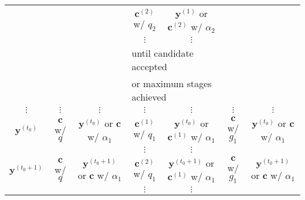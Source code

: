 \begin{sidewaystable}[h]
\begin{tabular}{|c||c|c||c|c||c|c|}
\cline{4-5}
                     &                         &                                         & $\mathbf{c}^{(2)}$ w/ $q_2$     & $\mathbf{y}^{(1)}$ or $\mathbf{c}^{(2)}$ w/ $\alpha_2$       &                  &                                         \\
\cline{4-5}
                     &                         &                                         & $\vdots$               & $\vdots$                                        &                  &                                         \\
\cline{4-5}
                     &                         &                                         & \multicolumn{2}{l||}{until candidate accepted}                           &                  &                                         \\
                     &                         &                                         & \multicolumn{2}{l||}{or maximum stages achieved}                         &                  &                                         \\
\hline
\hline
$\vdots$             & $\vdots$                & $\vdots$                                & $\vdots$               & $\vdots$                                        & $\vdots$         & $\vdots$                                \\
\hline
\hline
$\mathbf{y}^{(t_0)}$     & $\mathbf{c}$ w/ $q$              & $\mathbf{y}^{(t_0)}$ or $\mathbf{c}$ w/ $\alpha_1$     & $\mathbf{c}^{(1)}$ w/ $q_1$     & $\mathbf{y}^{(t_0)}$ or $\mathbf{c}^{(1)}$ w/ $\alpha_1$     & $\mathbf{c}$ w/ $g_1$     & $\mathbf{y}^{(t_0)}$ or $\mathbf{c}$ w/ $\alpha_1$     \\
\cline{4-5}
                     &                         &                                         & $\vdots$               & $\vdots$                                        &                  &                                         \\
\hline
\hline
$\mathbf{y}^{(t_0+1)}$   & $\mathbf{c}$ w/ $q$              & $\mathbf{y}^{(t_0+1)}$ or $\mathbf{c}$ w/ $\alpha_1$   & $\mathbf{c}^{(2)}$ w/ $q_1$     & $\mathbf{y}^{(t_0+1)}$ or $\mathbf{c}^{(1)}$ w/ $\alpha_1$   & $\mathbf{c}$ w/ $g_1$     & $\mathbf{y}^{(t_0+1)}$ or $\mathbf{c}$ w/ $\alpha_1$   \\
\cline{4-5}
                     &                         &                                         & $\vdots$               & $\vdots$                                        &                  &                                         \\

\end{tabular}
\end{sidewaystable}
